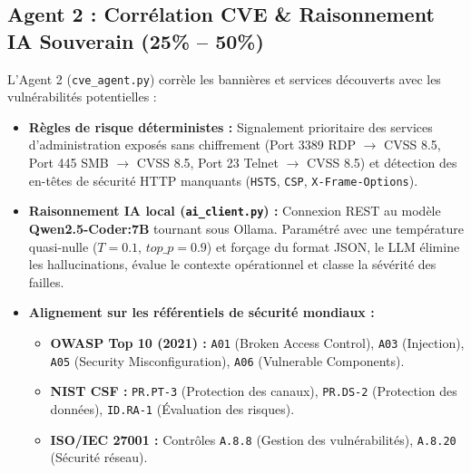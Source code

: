 \documentclass[11pt,a4paper,oneside]{article}
\begin{document}
\subsection{Agent 2 : Corrélation CVE \& Raisonnement IA Souverain (25\% -- 50\%)}
L'Agent 2 (\texttt{cve\_agent.py}) corrèle les bannières et services découverts avec les vulnérabilités potentielles :
\begin{itemize}
    \item \textbf{Règles de risque déterministes :} Signalement prioritaire des services d'administration exposés sans chiffrement (Port 3389 RDP $\to$ CVSS 8.5, Port 445 SMB $\to$ CVSS 8.5, Port 23 Telnet $\to$ CVSS 8.5) et détection des en-têtes de sécurité HTTP manquants (\texttt{HSTS}, \texttt{CSP}, \texttt{X-Frame-Options}).
    \item \textbf{Raisonnement IA local (\texttt{ai\_client.py}) :} Connexion REST au modèle \textbf{Qwen2.5-Coder:7B} tournant sous Ollama. Paramétré avec une température quasi-nulle ($T = 0.1$, $top\_p = 0.9$) et forçage du format JSON, le LLM élimine les hallucinations, évalue le contexte opérationnel et classe la sévérité des failles.
    \item \textbf{Alignement sur les référentiels de sécurité mondiaux :}
    \begin{itemize}
        \item \textbf{OWASP Top 10 (2021) :} \texttt{A01} (Broken Access Control), \texttt{A03} (Injection), \texttt{A05} (Security Misconfiguration), \texttt{A06} (Vulnerable Components).
        \item \textbf{NIST CSF :} \texttt{PR.PT-3} (Protection des canaux), \texttt{PR.DS-2} (Protection des données), \texttt{ID.RA-1} (Évaluation des risques).
        \item \textbf{ISO/IEC 27001 :} Contrôles \texttt{A.8.8} (Gestion des vulnérabilités), \texttt{A.8.20} (Sécurité réseau).
    \end{itemize}
\end{itemize}
\end{document}

